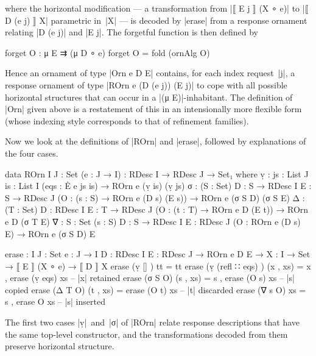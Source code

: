 where the horizontal modification --- a transformation from |⟦ E j ⟧ (X ∘ e)| to |⟦ D (e j) ⟧ X| parametric in~|X| --- is decoded by |erase| from a response ornament relating |D (e j)| and |E j|.
The forgetful function is then defined by
\begin{code}
forget O : μ E ⇉ (μ D ∘ e)
forget O = fold (ornAlg O)
\end{code}
Hence an ornament of type |Orn e D E| contains, for each index request~|j|, a response ornament of type |ROrn e (D (e j)) (E j)| to cope with all possible horizontal structures that can occur in a |(μ E)|-inhabitant.
The definition of |Orn| given above is a restatement of this in an intensionally more flexible form (whose indexing style corresponds to that of refinement families).

Now we look at the definitions of |ROrn| and |erase|, followed by explanations of the four cases.
\begin{code}
data ROrn {I J : Set} (e : J → I) : RDesc I → RDesc J → Set₁ where
  ṿ   :  {js : List J} {is : List I} (eqs : Ė e js is) → ROrn e (ṿ is) (ṿ js)
  σ   :  (S : Set) {D : S → RDesc I} {E : S → RDesc J}
         (O : (s : S) → ROrn e (D s) (E s)) → ROrn e (σ S D) (σ S E)
  Δ   :  (T : Set) {D : RDesc I} {E : T → RDesc J}
         (O : (t : T) → ROrn e D (E t)) → ROrn e D (σ T E)
  ∇   :  {S : Set} (s : S) {D : S → RDesc I} {E : RDesc J}
         (O : ROrn e (D s) E) → ROrn e (σ S D) E
           
erase :  {I J : Set} {e : J → I} {D : RDesc I} {E : RDesc J} →
         ROrn e D E → {X : I → Set} → ⟦ E ⟧ (X ∘ e) → ⟦ D ⟧ X
erase (ṿ []            )  tt         = tt
erase (ṿ (refl ∷ eqs)  )  (x ,  xs)  = x  ,  erase (ṿ eqs)  xs  -- |x| retained
erase (σ S O)             (s ,  xs)  = s  ,  erase (O s)    xs  -- |s| copied
erase (Δ T O)             (t ,  xs)  =       erase (O t)    xs  -- |t| discarded
erase (∇ s O)                   xs   = s  ,  erase O        xs  -- |s| inserted
\end{code}
The first two cases |ṿ|~and~|σ| of |ROrn| relate response descriptions that have the same top-level constructor, and the transformations decoded from them preserve horizontal structure.

